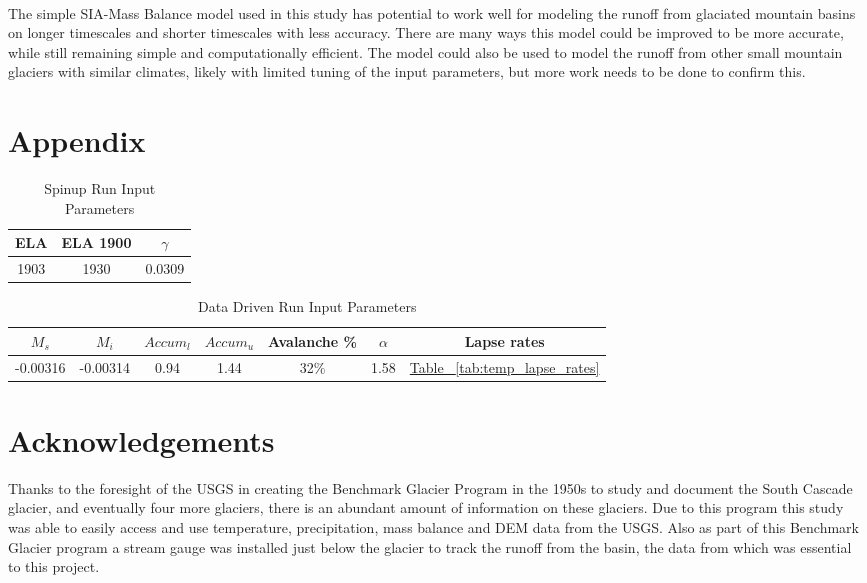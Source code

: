 \documentclass{article}
\begin{document}
\paragraph{}
The simple SIA-Mass Balance model used in this study has potential to work well for modeling the runoff from glaciated mountain basins on longer 
timescales and shorter timescales with less accuracy. There are many ways this model could be improved to be more accurate, while still 
remaining simple and computationally efficient. The model could also be used to model the runoff from other small mountain glaciers with similar climates, 
likely with limited tuning of the input parameters, but more work needs to be done to confirm this. 
\section*{Appendix}
\begin{table}[h!]
    \centering
    \begin{tabular}{|c|c|c|}
        \hline
        ELA &ELA 1900 & $\gamma$ \\
        \hline
        1903 & 1930 &0.0309\\
        \hline
    \end{tabular}
    \caption{Spinup Run Input Parameters}
    \label{tab:spinup_run_input_parameters}
\end{table}
\begin{table}[h!]
    \centering
    \begin{tabular}{|c|c|c|c|c|c|c|}
        \hline
         $M_s$ &$M_i$ & ${Accum}_l$ & ${Accum}_u$ & Avalanche \% & $\alpha$ & Lapse rates\\
        \hline
        -0.00316 & -0.00314 & 0.94 & 1.44 & 32\%  &1.58&\hyperref[tab:temp_lapse_rates]{Table ~\ref{tab:temp_lapse_rates}}\\
        \hline
    \end{tabular}
    \caption{Data Driven Run Input Parameters}
    \label{tab:dat_run_input_parameters}
\end{table}

\section*{Acknowledgements}
Thanks to the foresight of the USGS in creating the Benchmark Glacier Program in the 1950s to study and document the South Cascade glacier, 
and eventually four more glaciers, there is an abundant amount of information on these glaciers. Due to this program this study was able to 
easily access and use temperature, precipitation, mass balance and DEM data from the USGS. Also as part of this Benchmark Glacier program a 
stream gauge was installed just below the glacier to track the runoff from the basin, the data from which was essential to this project.
\end{document}

